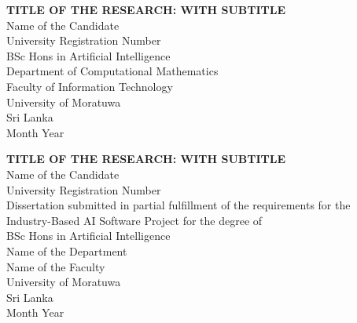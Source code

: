 \documentclass[12pt, a4paper]{report}
\begin{document}
\setcounter{page}{1}
\thispagestyle{plain}

\begin{center}
    \vspace*{1in}
    \textbf{\large TITLE OF THE RESEARCH: WITH SUBTITLE}\\[2in]
    
    Name of the Candidate\\[0.5in]
    University Registration Number\\[1.5in]
    
    BSc Hons in Artificial Intelligence\\[1.5in]
    
    Department of Computational Mathematics\\
    Faculty of Information Technology\\[0.5in]
    
    University of Moratuwa\\
    Sri Lanka\\[1in]
    
    Month Year
\end{center}

\clearpage
\begin{center}
    \vspace*{1in}
    \textbf{\large TITLE OF THE RESEARCH: WITH SUBTITLE}\\[1.5in]
    
    Name of the Candidate\\[0.5in]
    University Registration Number\\[1in]
    
    Dissertation submitted in partial fulfillment of the requirements for the\\
    Industry-Based AI Software Project for the degree of\\[0.2in]
    BSc Hons in Artificial Intelligence\\[1in]
    
    Name of the Department\\
    Name of the Faculty\\[0.5in]
    
    University of Moratuwa\\
    Sri Lanka\\[1in]
    
    Month Year
\end{center}
\end{document}

